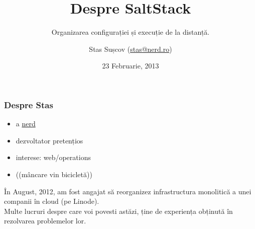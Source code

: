 \documentclass[compress]{beamer}
\title{Despre SaltStack}
\subtitle{Organizarea configurației și execuție de la distanță.}
\author{Stas Sușcov (\href{mailto:stas@nerd.ro}{stas@nerd.ro})}
\date{23 Februarie, 2013}
\institute{GeekMeet \#15, Cluj-Napoca, Transylvania}
\begin{document}
\maketitle

\begin{frame}
\frametitle{Despre Stas}

\begin{itemize}
  \item a \href{http://stas.nerd.ro}{nerd}
  \item dezvoltator pretențios
  \item interese: web/operations
  \item (\Heart (mâncare vin bicicletă))
\end{itemize}
\end{frame}

\begin{frame}
  \begin{center}
    \huge În August, 2012, am fost angajat să reorganizez infrastructura monolitică a unei companii
    în cloud (pe Linode).
    \\
    \small Multe lucruri despre care voi povesti astăzi, ține de experiența obținută în rezolvarea problemelor lor.
  \end{center}
\end{frame}
\end{document}
